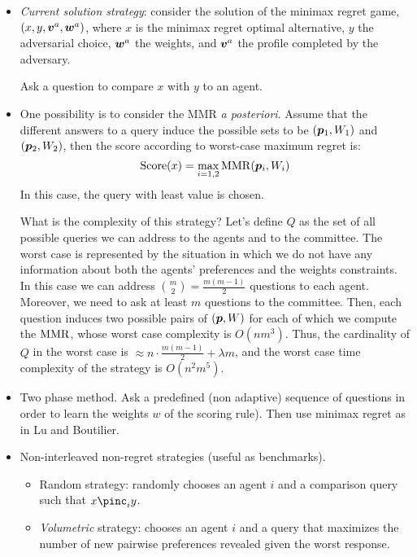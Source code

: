 
\begin{itemize}
\item {\em Current solution strategy}: consider the solution of the minimax regret game, 
 $(x,y,\bm{v}^{a},\bm{w}^{a})$, where $x$ is the minimax regret optimal alternative, $y$ the adversarial choice, $\bm{w}^{a}$ the weights, and $\bm{v}^{a}$ the profile completed by the adversary.

Ask a question to compare $x$ with $y$ to an agent.

 
 \item One possibility is to consider the MMR {\em a posteriori}. Assume that the different answers to a query induce the possible sets to be $({\bm{p}}_1,W_1)$ and $({\bm{p}}_2,W_2)$, then the score according to worst-case maximum regret is:
\[\operatorname{Score}(x)= \max_{i=1,2} \operatorname{MMR}({\bm{p}}_i,W_i) \]
In this case, the query with least value is chosen.

What is the complexity of this strategy? Let's define $Q$ as the set of all possible queries we can address to the agents and to the committee. The worst case is represented by the situation in which we do not have any information about both the agents' preferences and the weights constraints. In this case we can address $\binom{m}{2}=\frac{m(m-1)}{2}$ questions to each agent. Moreover, we need to ask at least $m$ questions to the committee. Then, each question induces two possible pairs of $({\bm{p}},W)$ for each of which we compute the $\operatorname{MMR}$, whose worst case complexity is $O(nm^3)$. Thus, the cardinality of $Q$ in the worst case is $\approx n \cdot \frac{m(m-1)}{2} + \lambda m$, and the worst case time complexity of the strategy is $O(n^2m^5)$.

\item Two phase method.
Ask a predefined (non adaptive) sequence of questions in order to learn the weights $w$ of the scoring rule).
Then use minimax regret as in Lu and Boutilier.


\item Non-interleaved non-regret strategies (useful as benchmarks).	
	\begin{itemize}
		\item Random strategy: randomly chooses an agent $i$ and a comparison query such that $x \pinc_i y$.
		\item {\em Volumetric} strategy: chooses an agent $i$ and a query that maximizes the number of new pairwise preferences revealed given the worst response.
	\end{itemize}
\end{itemize}

